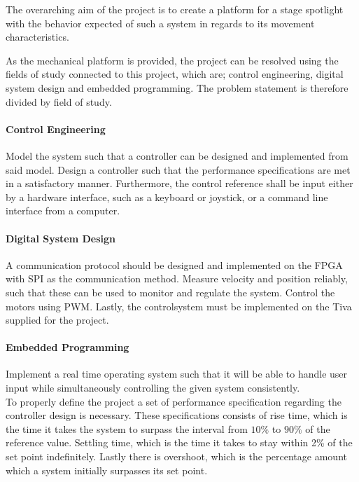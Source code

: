 \documentclass[../../main]{subfiles}
\begin{document}
The overarching aim of the project is to create a platform for a stage spotlight with the behavior expected of such a system in regards to its movement characteristics.

As the mechanical platform is provided, the project can be resolved using the fields of study connected to this project, which are; control engineering, digital system design and embedded programming.
The problem statement is therefore divided by field of study.


\paragraph{Control Engineering}%
\label{par:control_engineering}
Model the system such that a controller can be designed and implemented from said model.
Design a controller such that the performance specifications are met in a satisfactory manner.
Furthermore, the control reference shall be input either by a hardware interface, such as a keyboard or joystick, or a command line interface from a computer.

\paragraph{Digital System Design}%
\label{par:digital_system_design}
A communication protocol should be designed and implemented on the FPGA with SPI as the communication method.
Measure velocity and position reliably, such that these can be used to monitor and regulate the
system.
Control the motors using PWM. Lastly, the controlsystem must be implemented on the Tiva supplied for the project.

\paragraph{Embedded Programming}%
\label{par:emebedded_programming}
Implement a real time operating system such that it will be able to handle user input while simultaneously controlling the given system consistently.
\\

To properly define the project a set of performance specification regarding the controller design is necessary.
These specifications consists of rise time, which is the time it takes the system to surpass the interval from $10\%$ to $90\%$ of the reference value.
Settling time, which is the time it takes to stay within 2\% of the set point indefinitely.
Lastly there is overshoot, which is the percentage amount which a system initially surpasses its set point.\\
\end{document}
